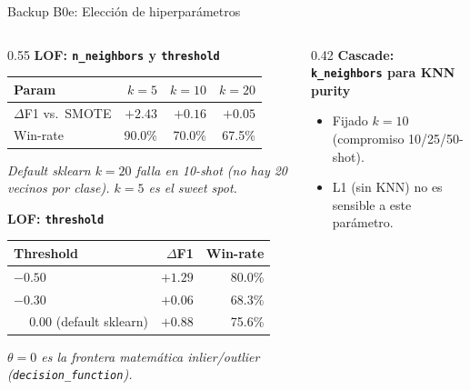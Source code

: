 
\begin{frame}{Backup B0e: Elección de hiperparámetros}
\scriptsize
\begin{columns}[T]

\begin{column}{0.55\textwidth}
\textbf{LOF: \texttt{n\_neighbors} y \texttt{threshold}}\\[2pt]
\begin{tabular}{@{}lrrr@{}}
\toprule
Param & $k=5$ & $k=10$ & $k=20$ \\
\midrule
$\Delta$F1 vs.\ SMOTE & \alert{$+2.43$} & $+0.16$ & $+0.05$ \\
Win-rate              & 90.0\%         & 70.0\% & 67.5\% \\
\bottomrule
\end{tabular}

\vspace{0.2em}
{\itshape Default sklearn $k{=}20$ falla en 10-shot (no hay 20 vecinos por clase). $k{=}5$ es el sweet spot.}

\vspace{0.5em}
\textbf{LOF: \texttt{threshold}}\\[2pt]
\begin{tabular}{@{}lrr@{}}
\toprule
Threshold & $\Delta$F1 & Win-rate \\
\midrule
$-0.50$       & $+1.29$ & 80.0\% \\
$-0.30$       & $+0.06$ & 68.3\% \\
$\phantom{-}0.00$ (default sklearn) & $+0.88$ & 75.6\% \\
\bottomrule
\end{tabular}
{\itshape $\theta{=}0$ es la frontera matemática inlier/outlier (\texttt{decision\_function}).}
\end{column}

\begin{column}{0.42\textwidth}
\textbf{Cascade: \texttt{k\_neighbors} para KNN purity}
\begin{itemize}\setlength\itemsep{0pt}
  \item Fijado $k{=}10$ (compromiso 10/25/50-shot).
  \item L1 (sin KNN) no es sensible a este parámetro.
\end{itemize}


\end{column}
\end{columns}
\end{frame}
